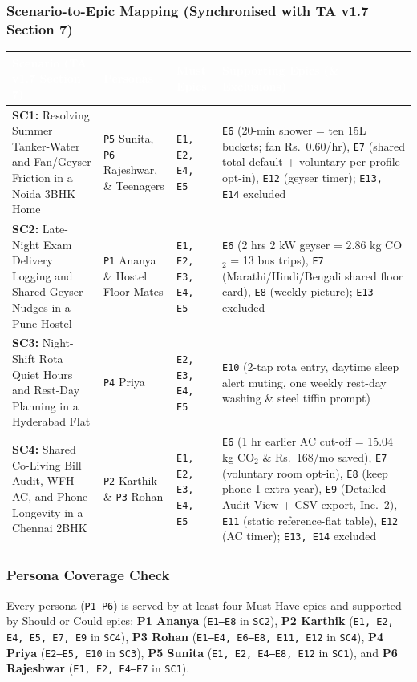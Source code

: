 \documentclass[12pt, a4paper]{article}
\begin{document}
\subsubsection{Scenario-to-Epic Mapping (Synchronised with TA v1.7 Section 7)}
{\footnotesize
{}
\begin{longtable}{|>{\raggedright\arraybackslash}p{5.3cm}|>{\raggedright\arraybackslash}p{2.8cm}|>{\raggedright\arraybackslash}p{2.3cm}|>{\raggedright\arraybackslash}p{5.6cm}|}
\hline
\rowcolor{cNavy}
\textcolor{white}{\textbf{Scenario (TA v1.7 Section 7)}} & \textcolor{white}{\textbf{Personas}} & \textcolor{white}{\textbf{Must Epics}} & \textcolor{white}{\textbf{Supporting Epics (\& Exclusions)}} \\
\hline
\textbf{SC1:} Resolving Summer Tanker-Water and Fan/Geyser Friction in a Noida 3BHK Home & \texttt{P5} Sunita, \texttt{P6} Rajeshwar, \& Teenagers & \texttt{E1, E2, E4, E5} & \texttt{E6} (20-min shower = ten 15L buckets; fan Rs.\ 0.60/hr), \texttt{E7} (shared total default + voluntary per-profile opt-in), \texttt{E12} (geyser timer); \texttt{E13, E14} excluded \\
\hline
\textbf{SC2:} Late-Night Exam Delivery Logging and Shared Geyser Nudges in a Pune Hostel & \texttt{P1} Ananya \& Hostel Floor-Mates & \texttt{E1, E2, E3, E4, E5} & \texttt{E6} (2 hrs 2 kW geyser = 2.86 kg CO$_2$ = 13 bus trips), \texttt{E7} (Marathi/Hindi/Bengali shared floor card), \texttt{E8} (weekly picture); \texttt{E13} excluded \\
\hline
\textbf{SC3:} Night-Shift Rota Quiet Hours and Rest-Day Planning in a Hyderabad Flat & \texttt{P4} Priya & \texttt{E2, E3, E4, E5} & \texttt{E10} (2-tap rota entry, daytime sleep alert muting, one weekly rest-day washing \& steel tiffin prompt) \\
\hline
\textbf{SC4:} Shared Co-Living Bill Audit, WFH AC, and Phone Longevity in a Chennai 2BHK & \texttt{P2} Karthik \& \texttt{P3} Rohan & \texttt{E1, E2, E3, E4, E5} & \texttt{E6} (1 hr earlier AC cut-off = 15.04 kg CO$_2$ \& Rs.\ 168/mo saved), \texttt{E7} (voluntary room opt-in), \texttt{E8} (keep phone 1 extra year), \texttt{E9} (Detailed Audit View + CSV export, Inc.\ 2), \texttt{E11} (static reference-flat table), \texttt{E12} (AC timer); \texttt{E13, E14} excluded \\
\hline
\end{longtable}
}

\subsubsection{Persona Coverage Check}
Every persona (\texttt{P1}--\texttt{P6}) is served by at least four Must Have epics and supported by Should or Could epics: \textbf{P1 Ananya} (\texttt{E1--E8} in \texttt{SC2}), \textbf{P2 Karthik} (\texttt{E1, E2, E4, E5, E7, E9} in \texttt{SC4}), \textbf{P3 Rohan} (\texttt{E1--E4, E6--E8, E11, E12} in \texttt{SC4}), \textbf{P4 Priya} (\texttt{E2--E5, E10} in \texttt{SC3}), \textbf{P5 Sunita} (\texttt{E1, E2, E4--E8, E12} in \texttt{SC1}), and \textbf{P6 Rajeshwar} (\texttt{E1, E2, E4--E7} in \texttt{SC1}).
\end{document}
